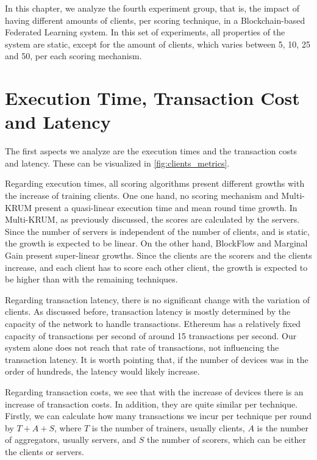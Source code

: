 In this chapter, we analyze the fourth experiment group, that is, the impact of having different amounts of clients, per scoring technique, in a Blockchain-based Federated Learning system. In this set of experiments, all properties of the system are static, except for the amount of clients, which varies between 5, 10, 25 and 50, per each scoring mechanism.

\section{Execution Time, Transaction Cost and Latency}

The first aspects we analyze are the execution times and the transaction costs and latency. These can be visualized in \autoref{fig:clients_metrics}.

Regarding execution times, all scoring algorithms present different growths with the increase of training clients. One one hand, no scoring mechanism and Multi-KRUM present a quasi-linear execution time and mean round time growth. In Multi-KRUM, as previously discussed, the scores are calculated by the servers. Since the number of servers is independent of the number of clients, and is static, the growth is expected to be linear. On the other hand, BlockFlow and Marginal Gain present super-linear growths. Since the clients are the scorers and the clients increase, and each client has to score each other client, the growth is expected to be higher than with the remaining techniques.

Regarding transaction latency, there is no significant change with the variation of clients. As discussed before, transaction latency is mostly determined by the capacity of the network to handle transactions. Ethereum has a relatively fixed capacity of transactions per second of around 15 transactions per second. Our system alone does not reach that rate of transactions, not influencing the transaction latency. It is worth pointing that, if the number of devices was in the order of hundreds, the latency would likely increase.

Regarding transaction costs, we see that with the increase of devices there is an increase of transaction costs. In addition, they are quite similar per technique. Firstly, we can calculate how many transactions we incur per technique per round by $T+A+S$, where $T$ is the number of trainers, usually clients, $A$ is the number of aggregators, usually servers, and $S$ the number of scorers, which can be either the clients or servers.

